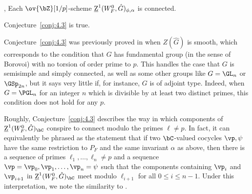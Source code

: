 \begin{conjecture}\cite[4.3]{DHKM}, \cite[3.10]{Dat-notes}\label{conj:4.3}
    Each $\ov{\bZ}[1/p]$-scheme $\underline{\rm{Z}}^1(W_F^0, \hat{G})_{\phi, \alpha}$ is connected.
\end{conjecture}

\begin{theorem}\label{theorem:intro-MAIN}
    Conjecture~\ref{conj:4.3} is true.
\end{theorem}

Conjecture~\ref{conj:4.3} was previously proved in \cite[4.30]{DHKM} when $Z(\hat{G})$ is smooth, which corresponds to the condition that $G$ has fundamental group (in the sense of Borovoi) with no torsion of order prime to $p$. This handles the case that $G$ is semisimple and simply connected, as well as some other groups like $G = \GL_n$ or $\GSp_{2n}$, but it says very little if, for instance, $G$ is of adjoint type. Indeed, when $G = \PGL_n$ for an integer $n$ which is divisible by at least two distinct primes, this condition does not hold for any $p$.\smallskip

Roughly, Conjecture~\ref{conj:4.3} describes the way in which components of $\underline{\rm{Z}}^1(W_F^0, \hat{G})_{\bC}$ conspire to connect modulo the primes $\ell \neq p$. In fact, it can equivalently be phrased as the statement that if two $\bC$-valued cocycles $\vp, \psi$ have the same restriction to $P_F$ and the same invariant $\alpha$ as above, then there is a sequence of primes $\ell_1, \dots, \ell_n \neq p$ and a sequence $\vp = \vp_0, \vp_1, \dots, \vp_n = \psi$ such that the components containing $\vp_i$ and $\vp_{i+1}$ in $\underline{\rm{Z}}^1(W_F^0, \hat{G})_{\bC}$ meet modulo $\ell_{i+1}$ for all $0 \leq i \leq n-1$. Under this interpretation, we note the similarity to \cite[Thm.\ B]{Secherre-Stevens}. \smallskip

